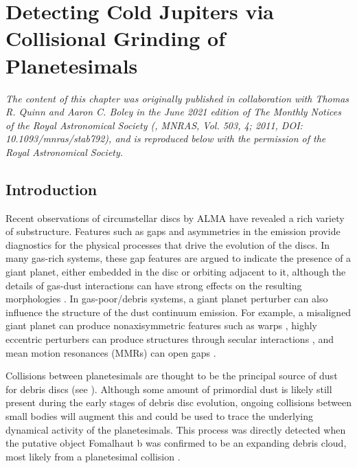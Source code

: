 \chapter {Detecting Cold Jupiters via Collisional Grinding of Planetesimals}\label{ch:grind}

\noindent \textit{The content of this chapter was originally published in collaboration with Thomas R. Quinn and Aaron C. Boley in the June 2021 edition of The Monthly Notices of the Royal Astronomical Society (\cite{wallace21}, MNRAS, Vol. 503, 4; 2011, DOI: 10.1093/mnras/stab792), and is reproduced below with the permission of the Royal Astronomical Society.}

\section{Introduction} \label{sec:intro}

Recent observations of circumstellar discs by ALMA have revealed a rich variety of substructure. Features such as gaps and 
asymmetries \cite{alma15, perez16, isella16, andrews16, cieza16} in the emission provide diagnostics for the physical 
processes that drive the evolution of the discs. In many gas-rich systems, these gap features are argued to indicate the 
presence of a giant planet, either embedded in the disc \cite{dipierro15} or orbiting adjacent to it, although the details of gas-dust 
interactions can have strong effects on the resulting morphologies \cite{dong18}. In gas-poor/debris systems, a giant planet 
perturber can also influence the structure of the dust continuum emission. For example, a misaligned giant planet can produce 
nonaxisymmetric features such as warps \cite{augereau01}, highly eccentric perturbers can produce structures through secular 
interactions \cite{pearce14, pearce15}, and mean motion resonances (MMRs) can open gaps
\cite{nesvold15, tabeshian16, tabeshian18}.

Collisions between planetesimals are thought to be the principal source of dust for debris discs (see \cite{wyatt08}).  Although 
some amount of primordial dust is likely still present during the early stages of debris disc evolution, ongoing collisions between 
small bodies will augment this and could be used to trace the underlying dynamical activity of the planetesimals. This process 
was directly detected when the putative object Fomalhaut b was confirmed to be an expanding debris cloud, most likely from a 
planetesimal collision \cite{gaspar20}. 

